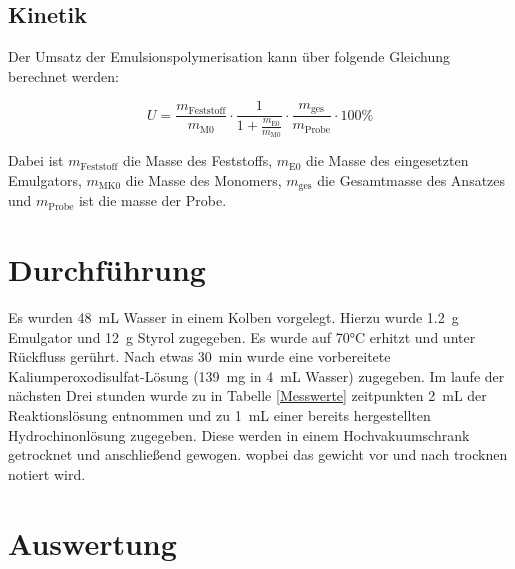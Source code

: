 \documentclass[10pt,a4paper,ngerman]{scrartcl}
\begin{document}
	\subsection{Kinetik}

		Der Umsatz der Emulsionspolymerisation kann über folgende Gleichung berechnet werden:

			\begin{equation}
				U = \frac{m_\text{Feststoff}}{m_\text{M0}} \cdot \frac{1}{1 + \frac{m_\text{E0}}{m_\text{M0}}}\cdot \frac{m_\text{ges}}{m_\text{Probe}} \cdot 100\%
				\label{Umsatz}
			\end{equation}

		Dabei ist $m_\text{Feststoff}$ die Masse des Feststoffs, $m_\text{E0}$ die Masse des eingesetzten Emulgators, 
		$m_\text{MK0}$ die Masse des Monomers, $m_\text{ges}$ die Gesamtmasse des Ansatzes und $m_\text{Probe}$ ist die masse der Probe.
		


\section{Durchführung}

	Es wurden \SI{48}{mL} Wasser in einem Kolben vorgelegt. Hierzu wurde \SI{1,2}{g} Emulgator und \SI{12}{g} Styrol zugegeben. 
	Es wurde auf 70°C erhitzt und unter Rückfluss gerührt. Nach etwas \SI{30}{min} wurde eine vorbereitete Kaliumperoxodisulfat-Lösung (\SI{139}{mg} in \SI{4}{mL} Wasser) zugegeben.
	Im laufe der nächsten Drei stunden wurde zu in Tabelle \ref{Messwerte} zeitpunkten \SI{2}{mL} der Reaktionslösung entnommen und zu \SI{1}{mL} einer bereits hergestellten Hydrochinonlösung zugegeben.
	Diese werden in einem Hochvakuumschrank getrocknet und anschließend gewogen. wopbei das gewicht vor und nach trocknen notiert wird.

\section{Auswertung}
\end{document}
